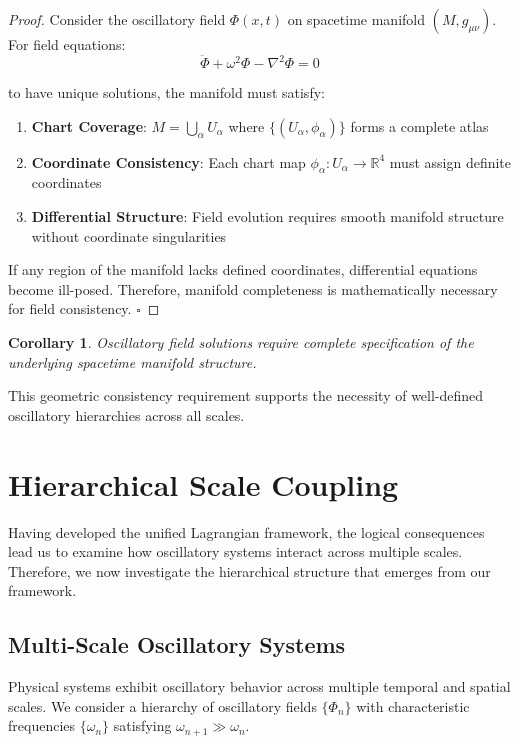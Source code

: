 \documentclass[11pt]{article}
\newtheorem{corollary}[theorem]{Corollary}
\theoremstyle{remark}
\begin{document}
\begin{proof}
Consider the oscillatory field $\Phi(x,t)$ on spacetime manifold $(M, g_{\mu\nu})$. For field equations:
$$\ddot{\Phi} + \omega^2\Phi - \nabla^2\Phi = 0$$

to have unique solutions, the manifold must satisfy:

\begin{enumerate}
\item \textbf{Chart Coverage}: $M = \bigcup_\alpha U_\alpha$ where $\{(U_\alpha, \phi_\alpha)\}$ forms a complete atlas
\item \textbf{Coordinate Consistency}: Each chart map $\phi_\alpha: U_\alpha \to \mathbb{R}^4$ must assign definite coordinates
\item \textbf{Differential Structure}: Field evolution requires smooth manifold structure without coordinate singularities
\end{enumerate}

If any region of the manifold lacks defined coordinates, differential equations become ill-posed. Therefore, manifold completeness is mathematically necessary for field consistency. $\square$
\end{proof}

\begin{corollary}
Oscillatory field solutions require complete specification of the underlying spacetime manifold structure.
\end{corollary}

This geometric consistency requirement supports the necessity of well-defined oscillatory hierarchies across all scales.

\section{Hierarchical Scale Coupling}

Having developed the unified Lagrangian framework, the logical consequences lead us to examine how oscillatory systems interact across multiple scales. Therefore, we now investigate the hierarchical structure that emerges from our framework.

\subsection{Multi-Scale Oscillatory Systems}

Physical systems exhibit oscillatory behavior across multiple temporal and spatial scales. We consider a hierarchy of oscillatory fields $\{\Phi_n\}$ with characteristic frequencies $\{\omega_n\}$ satisfying $\omega_{n+1} \gg \omega_n$.
\end{document}
